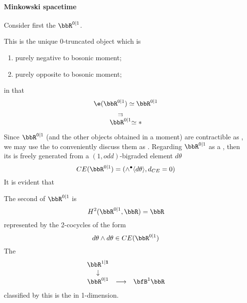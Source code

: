 \hypertarget{minkowski_spacetime}{}\paragraph*{{Minkowski spacetime}}\label{minkowski_spacetime}
Consider first the  $\bbR^{0|1}$.
\begin{remark}
\label{}\hypertarget{}{}
This is the unique 0-truncated object which is
\begin{enumerate}%
\item purely negative to bosonic moment;
\item purely opposite to bosonic moment;
\end{enumerate}
in that
\begin{displaymath}
\e(\bbR^{0|1})\simeq \bbR^{0|1}
\end{displaymath}
\begin{displaymath}
\stackrel{\rightrightarrows}{\bbR^{0|1}} \simeq \ast
\end{displaymath}
\end{remark}
Since $\bbR^{0|1}$ (and the other objects obtained in a moment) are contractible as , we may use the  to conveniently discuss them as . Regarding $\bbR^{0\vert 1}$ as a , then its  is freely generated from a $(1,odd)$-bigraded element $d\theta$
\begin{displaymath}
CE(\bbR^{0\vert 1})
=
\left(
\wedge^\bullet \langle d\theta \rangle, d_{CE} = 0
\right)
\end{displaymath}
It is evident that
\begin{prop}
\label{1dsuperMinkowskiFromInvariantExtension}\hypertarget{1dsuperMinkowskiFromInvariantExtension}{}
The second   of $\bbR^{0\vert 1}$ is
\begin{displaymath}
H^{2}(\bbR^{0\vert 1}, \bbR)
=
\bbR
\end{displaymath}
represented by the 2-cocycles of the form
\begin{displaymath}
d\theta\wedge d\theta
\in CE(\bbR^{0\vert 1})
\end{displaymath}
The 
\begin{displaymath}
\itexarray{
\bbR^{1|\mathbf{1}}
\\
\downarrow
\\
\bbR^{0|1}
&\stackrel{}{\longrightarrow}&
\bfB^1 \bbR
}
\end{displaymath}
classified by this is the  in 1-dimension.
\end{prop}
